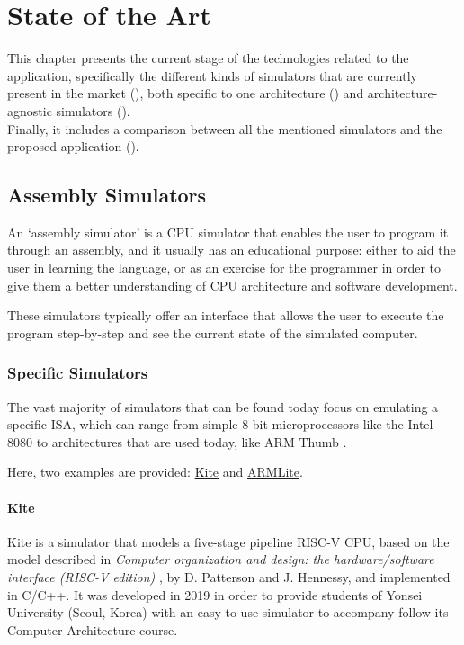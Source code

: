 \chapter{State of the Art}\label{chap:state-of-the-art}
This chapter presents the current stage of the technologies related to the application, specifically the different kinds of simulators that are currently present in the market (), both specific to one architecture () and architecture-agnostic simulators ().\\
Finally, it includes a comparison between all the mentioned simulators and the proposed application ().



\section{Assembly Simulators}\label{sec:assembly-simulators}
An `\gls{assembly simulator}' is a CPU simulator that enables the user to program it through an \gls{assembly}, and it usually has an educational purpose: either to aid the user in learning the language, or as an exercise for the programmer in order to give them a better understanding of CPU architecture and software development.

These simulators typically offer an interface that allows the user to execute the program step-by-step and see the current state of the simulated \gls{computer}.


\subsection{Specific Simulators}\label{subsec:specific-assembly-simulators}
The vast majority of simulators that can be found today focus on emulating a specific \gls{ISA}, which can range from simple 8-bit microprocessors like the Intel 8080 \parencite{i8080emulator} to architectures that are used today, like ARM Thumb \parencite{QtARMSim}.

\noindent
Here, two examples are provided: \hyperref[subsubsec:kite]{Kite} and \hyperref[subsubsec:armlite]{ARMLite}.


\subsubsection*{Kite}\label{subsubsec:kite}
Kite \parencite{song_kite2019} is a simulator that models a five-stage \gls{pipeline} RISC-V CPU, based on the model described in \textit{Computer organization and design: the hardware/software interface (RISC-V edition)} \parencite{PattersonDavidA.2018Coad}, by D. Patterson and J. Hennessy, and implemented in C/C++. It was developed in 2019 in order to provide students of Yonsei University (Seoul, Korea) with an easy-to use simulator to accompany follow its Computer Architecture course.

